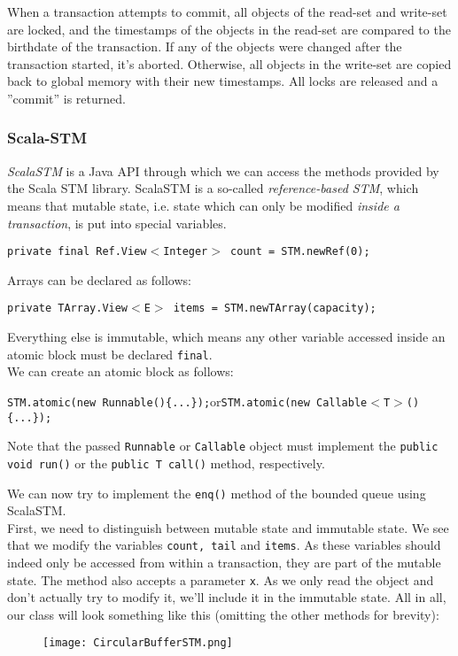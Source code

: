 \documentclass[main]{subfiles}
\begin{document}
When a transaction attempts to commit, all objects of the read-set and write-set are locked, and the timestamps of the objects in the read-set are compared to the birthdate of the transaction. If any of the objects were changed after the transaction started, it's aborted. Otherwise, all objects in the write-set are copied back to global memory with their new timestamps. All locks are released and a ''commit'' is returned.

\subsubsection{Scala-STM}
\textit{ScalaSTM} is a Java API through which we can access the methods provided by the Scala STM library. ScalaSTM is a so-called \textit{reference-based STM}, which means that mutable state, i.e. state which can only be modified \textit{inside a transaction}, is put into special variables.
\begin{center}
    \texttt{private final Ref.View$<$Integer$>$ count = STM.newRef(0);}
\end{center}
Arrays can be declared as follows:
\begin{center}
    \texttt{private TArray.View$<$E$>$ items = STM.newTArray(capacity);}
\end{center}
Everything else is immutable, which means any other variable accessed inside an atomic block must be declared \texttt{final}.\\[3mm]
We can create an atomic block as follows:
\begin{center}
    \texttt{STM.atomic(new Runnable()\{...\});}\quad or\quad \texttt{STM.atomic(new Callable$<$T$>$()\{...\});}
\end{center}
Note that the passed \texttt{Runnable} or \texttt{Callable} object must implement the \texttt{public void run()} or the \texttt{public T call()} method, respectively.\\[3mm]
\begin{example}
    We can now try to implement the \texttt{enq()} method of the bounded queue using ScalaSTM.\\[3mm]
    First, we need to distinguish between mutable state and immutable state. We see that we modify the variables \texttt{count, tail} and \texttt{items}. As these variables should indeed only be accessed from within a transaction, they are part of the mutable state. The method also accepts a parameter \texttt{x}. As we only read the object and don't actually try to modify it, we'll include it in the immutable state. All in all, our class will look something like this (omitting the other methods for brevity): 
    \begin{figure}[H]
        \centering
        \texttt{[image: CircularBufferSTM.png]}
    \end{figure}
    
\end{example}
\end{document}
